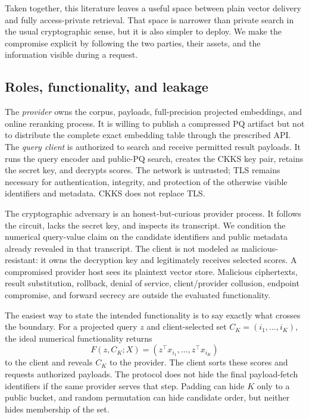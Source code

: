 \documentclass[pdflatex,sn-basic,Numbered]{sn-jnl}
\theoremstyle{plain}
\begin{document}
Taken together, this literature leaves a useful space between plain vector delivery and fully access-private retrieval. That space is narrower than private search in the usual cryptographic sense, but it is also simpler to deploy. We make the compromise explicit by following the two parties, their assets, and the information visible during a request.

\subsection{Roles, functionality, and leakage}\label{subsec:roles}

The \emph{provider} owns the corpus, payloads, full-precision projected embeddings, and online reranking process. It is willing to publish a compressed PQ artifact but not to distribute the complete exact embedding table through the prescribed API. The \emph{query client} is authorized to search and receive permitted result payloads. It runs the query encoder and public-PQ search, creates the CKKS key pair, retains the secret key, and decrypts scores. The network is untrusted; TLS remains necessary for authentication, integrity, and protection of the otherwise visible identifiers and metadata. CKKS does not replace TLS.

The cryptographic adversary is an honest-but-curious provider process. It follows the circuit, lacks the secret key, and inspects its transcript. We condition the numerical query-value claim on the candidate identifiers and public metadata already revealed in that transcript. The client is not modeled as malicious-resistant: it owns the decryption key and legitimately receives selected scores. A compromised provider host sees its plaintext vector store. Malicious ciphertexts, result substitution, rollback, denial of service, client/provider collusion, endpoint compromise, and forward secrecy are outside the evaluated functionality.

The easiest way to state the intended functionality is to say exactly what crosses the boundary. For a projected query $z$ and client-selected set $C_K=(i_1,\ldots,i_K)$, the ideal numerical functionality returns
\begin{equation}
  F(z,C_K;X)=\left(z^\top x_{i_1},\ldots,z^\top x_{i_K}\right)
  \label{eq:functionality}
\end{equation}
to the client and reveals $C_K$ to the provider. The client sorts these scores and requests authorized payloads. The protocol does not hide the final payload-fetch identifiers if the same provider serves that step. Padding can hide $K$ only to a public bucket, and random permutation can hide candidate order, but neither hides membership of the set.
\end{document}
